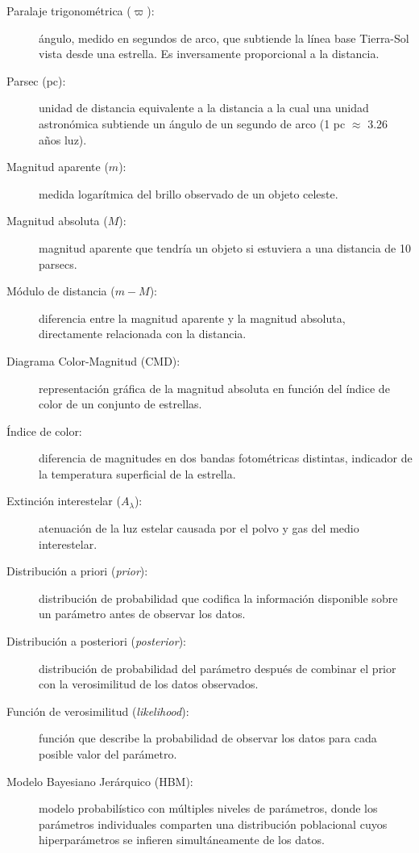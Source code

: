 \documentclass[stu, 12pt, letterpaper, donotrepeattitle, floatsintext, natbib]{apa7_ula}
\begin{document}
\begin{description}  %
    \item[Paralaje trigonométrica ($\varpi$):] ángulo, medido en
    segundos de arco, que subtiende la línea base Tierra-Sol vista
    desde una estrella. Es inversamente proporcional a la distancia.
    \item[Parsec (pc):] unidad de distancia equivalente a la
    distancia a la cual una unidad astronómica subtiende un ángulo
    de un segundo de arco (1 pc $\approx$ 3.26 años luz).
    \item[Magnitud aparente ($m$):] medida logarítmica del brillo
    observado de un objeto celeste.
    \item[Magnitud absoluta ($M$):] magnitud aparente que tendría
    un objeto si estuviera a una distancia de 10 parsecs.
    \item[Módulo de distancia ($m - M$):] diferencia entre la
    magnitud aparente y la magnitud absoluta, directamente
    relacionada con la distancia.
    \item[Diagrama Color-Magnitud (CMD):] representación gráfica de
    la magnitud absoluta en función del índice de color de un
    conjunto de estrellas.
    \item[Índice de color:] diferencia de magnitudes en dos bandas
    fotométricas distintas, indicador de la temperatura superficial
    de la estrella.
    \item[Extinción interestelar ($A_\lambda$):] atenuación de la
    luz estelar causada por el polvo y gas del medio interestelar.
    \item[Distribución a priori (\textit{prior}):] distribución de
    probabilidad que codifica la información disponible sobre un
    parámetro antes de observar los datos.
    \item[Distribución a posteriori (\textit{posterior}):]
    distribución de probabilidad del parámetro después de combinar
    el prior con la verosimilitud de los datos observados.
    \item[Función de verosimilitud (\textit{likelihood}):] función
    que describe la probabilidad de observar los datos para cada
    posible valor del parámetro.
    \item[Modelo Bayesiano Jerárquico (HBM):] modelo probabilístico
    con múltiples niveles de parámetros, donde los parámetros
    individuales comparten una distribución poblacional cuyos
    hiperparámetros se infieren simultáneamente de los datos.

\end{description}
\end{document}
